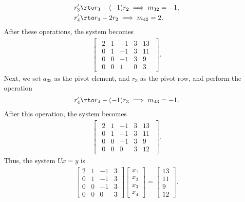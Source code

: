 \documentclass{report}
\begin{document}
    \begin{align*}
        &r_{3}^{\prime} \rto r_{3} - (-1)r_{2} \implies m_{32} = -1, \\
        &r_{4}^{\prime} \rto r_{4} - 2r_{2} \implies m_{42} = 2
    .\end{align*}
    After these operations, the system becomes
    \begin{align*}
        \begin{bmatrix}
            \begin{array}{cccc|c}
                2 & 1 & -1 & 3 & 13 \\
                0 & 1 & -1 & 3 & 11 \\
                0 & 0 & -1 & 3 & 9 \\
                0 & 0 & 1 & 0 & 3
            \end{array}
        \end{bmatrix}
    .\end{align*}
    Next, we set $a_{33}$ as the pivot element, and $r_{3}$ as the pivot row, and perform the operation
    \begin{align*}
        r_{4}^{\prime} \rto r_{4} - (-1)r_{3} \implies m_{43} = -1
    .\end{align*}
    After this operation, the system becomes
    \begin{align*}
        \begin{bmatrix}
            \begin{array}{cccc|c}
                2 & 1 & -1 & 3 & 13 \\
                0 & 1 & -1 & 3 & 11 \\
                0 & 0 & -1 & 3 & 9 \\
                0 & 0 & 0 & 3 & 12
            \end{array}
        \end{bmatrix}
    .\end{align*}
    Thus, the system $Ux = y$ is 
    \begin{align*}
        \begin{bmatrix}
            2 & 1 & -1 & 3  \\
            0 & 1 & -1 & 3 \\
            0 & 0 & -1 & 3\\
            0 & 0 & 0 & 3 
        \end{bmatrix}
        \begin{bmatrix}
            x_{1} \\ x_{2} \\ x_{3} \\ x_{4}
        \end{bmatrix}
        = 
        \begin{bmatrix}
            13 \\ 11 \\ 9 \\ 12
        \end{bmatrix}
    .\end{align*}
\end{document}
